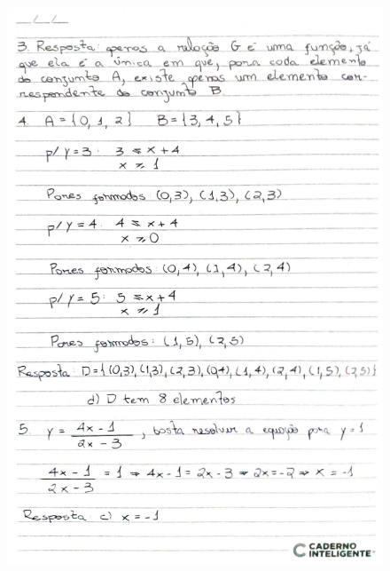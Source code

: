 \documentclass[
  12pt,     %
  openright,      %
  oneside,      %
  a4paper     %
  ]{abntex2}
\begin{document}
\begin{figure}[H]
  \centering
  \includegraphics[scale=0.23]{pagina3.jpg}
\end{figure}
\end{document}
